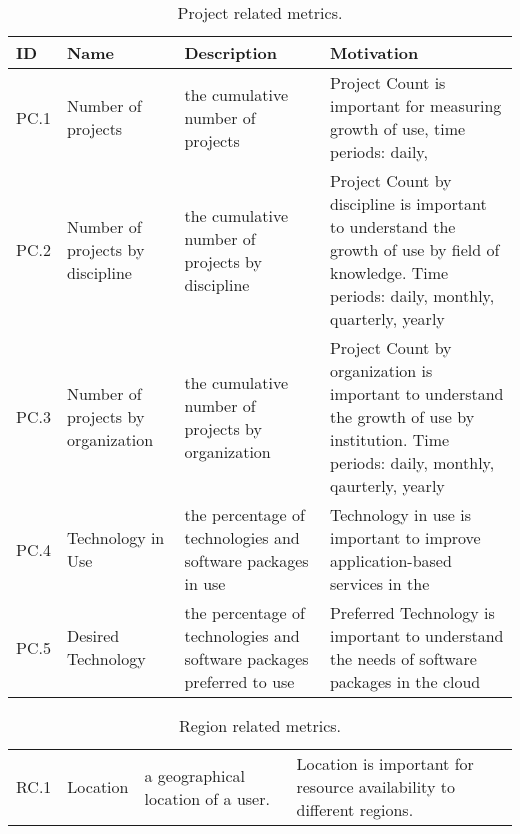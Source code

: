 \begin{table*}[P]
\caption{Project related metrics.}
\begin{scriptsize}
\label{T:metrics}
\bigskip
\begin{center}
\begin{tabular}{lp{}p{}p{}}
\hline
\rowcolor{blue!20} \bf ID & \bf Name & \bf Description & \bf Motivation \\
\hline 
PC.1 & Number of projects & 
the cumulative number of projects & 
Project Count is important for measuring growth of use, time periods:
                                    daily, \\
\hline
PC.2 & Number of projects by discipline & 
the cumulative number of projects by discipline &
Project Count by discipline is important to understand the growth of use by
field of knowledge.  Time periods: daily, monthly, quarterly, yearly \\
\hline
PC.3 & Number of projects by organization & 
the cumulative number of projects by organization &
Project Count by organization is important to understand the growth of use by
institution. Time periods: daily, monthly, qaurterly, yearly \\
\hline
PC.4 & Technology in Use & 
the percentage of technologies and software packages in use & 
Technology in use is important to improve application-based services
                                                              in the \\
\hline
PC.5 & Desired Technology &  
the percentage of technologies and software packages preferred to use &
Preferred Technology is important to understand the needs of software packages
in the cloud \\
\hline
\end{tabular}
\end{center}
\end{scriptsize}
\end{table*}

\begin{table*}[P]
\caption{Region related metrics.}
\begin{scriptsize}
\label{T:metrics}
\bigskip
\begin{center}
\begin{tabular}{lp{}p{}p{}}
\hline
RC.1 & 
Location & 
a geographical location of a user. & 
Location is important for resource availability to different regions. \\
\end{tabular}
\end{center}
\end{scriptsize}
\end{table*}


\clearpage